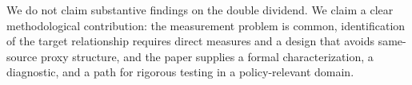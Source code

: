 We do not claim substantive findings on the double dividend. We claim a clear methodological contribution: the measurement problem is common, identification of the target relationship requires direct measures and a design that avoids same-source proxy structure, and the paper supplies a formal characterization, a diagnostic, and a path for rigorous testing in a policy-relevant domain.
